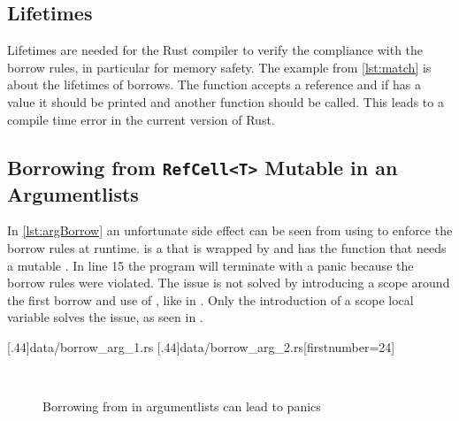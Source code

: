 \documentclass[thesis]{subfiles}
\begin{document}
  \subsection{Lifetimes}
    Lifetimes are needed for the Rust compiler to verify the compliance with the borrow rules, in particular for memory safety.
    The example from \autoref{lst:match} is about the lifetimes of borrows.
    The function \fun accepts a \Foo reference and if  has a value it should be printed and another function should be called.
    This leads to a compile time error in the current version of Rust.%
    ~\autocite[2094-nll]{rust-rfc}


  \subsection{Borrowing from \texttt{RefCell<T>} Mutable in an Argumentlists}
    In \autoref{lst:argBorrow} an unfortunate side effect can be seen from using \RefCellT to enforce the borrow rules at runtime.
    \F is a \struct that is wrapped by \RefCellT and has the function \fun that needs a mutable \Self.
    In line 15 the program will terminate with a panic because the borrow rules were violated.
    The issue is not solved by introducing a scope around the first borrow and use of , like in \hun.
    Only the introduction of a scope local variable solves the issue, as seen in \nun.

    \LstTikzBox{\borrowArgOne}[.44\linewidth]{data/borrow_arg_1.rs}
    \LstTikzBox{\borrowArgTwo}[.44\linewidth]{data/borrow_arg_2.rs}[firstnumber=24]
    \begin{figure}[ht]
      \captionsetup{type=lstlisting}
      \centering
      \usebox{\borrowArgOne}\hfill%
      \usebox{\borrowArgTwo}\\\vspace*{.75em}%
      \caption{Borrowing from \RefCellT in argumentlists can lead to panics}\label{lst:argBorrow}
    \end{figure}
\end{document}
